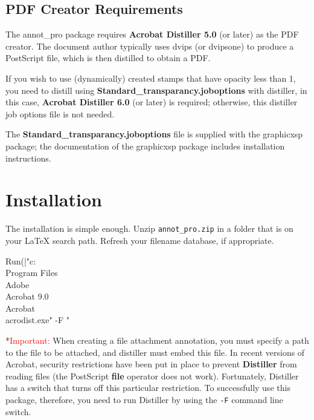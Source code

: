 \documentclass[12pt]{article}
\makeatletter
\renewcommand*{\theparagraph}{\texorpdfstring{\protect\P\protect\ }{\textparagraph}}
\renewcommand{\paragraph}
    {\renewcommand{\@seccntformat}[1]{\theparagraph}%
    \@startsection{paragraph}{4}{0pt}{6pt}{-3pt}{\color{\aeb@subsubsectioncolor}\bfseries}}
\makeatother
\begin{document}
\subsection{PDF Creator Requirements}

The \textsf{annot\_pro} package requires \textbf{Acrobat Distiller 5.0} (or
later) as the PDF creator. The document author typically uses dvips (or dvipsone) to
produce a PostScript file, which is then distilled to obtain a PDF.

If you wish to use (dynamically) created stamps that have opacity less than 1,
you need to distill using \textbf{Standard\_transparancy.joboptions} with distiller,
in this case, \textbf{Acrobat Distiller 6.0} (or later) is required; otherwise, this
distiller job options file is not needed.

The \textbf{Standard\_transparancy.joboptions} file is supplied with the \textsf{graphicxsp}
package; the documentation of the \textsf{graphicxsp} package includes installation instructions.

\section{Installation}

The installation is simple enough. Unzip \texttt{annot\_pro.zip} in a
folder that is on your {\LaTeX} search path.  Refresh your filename
database, if appropriate.

\begin{defineJS}{\winedtDist}
Run(|"c:\\Program Files\\Adobe\\Acrobat 9.0\\Acrobat\\acrodist.exe" -F "%
\end{defineJS}

\paragraph*{\textcolor{red}{Important:}} When creating a file attachment annotation,
you must specify a path to the file to be attached, and distiller must embed
this file.  In recent versions of Acrobat,
security restrictions have been put in place to prevent
\textbf{Distiller} from reading files (the PostScript \textbf{file}
operator does not work). Fortunately, Distiller has a switch that
turns off this particular restriction. To successfully use this
package, therefore, you need to run Distiller by using the
\texttt{-F} command line switch.
\end{document}
